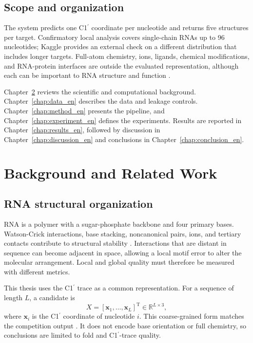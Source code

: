 \documentclass[12pt,a4paper,oneside]{report}
\newcommand{\cprime}{C1$^{\prime}$}
\newcommand{\T}{\mathrm{T}}
\begin{document}
\section{Scope and organization}

The system predicts one \cprime{} coordinate per nucleotide and returns five structures
per target. Confirmatory local analysis covers single-chain RNAs up to 96 nucleotides;
Kaggle provides an external check on a different distribution that includes longer
targets. Full-atom chemistry, ions, ligands, chemical modifications, and RNA-protein
interfaces are outside the evaluated representation, although each can be important to
RNA structure and function \cite{butcher_tertiary,zhang_experimental_review}.

Chapter~\ref{chap:background_en} reviews the scientific and computational background.
Chapter~\ref{chap:data_en} describes the data and leakage controls.
Chapter~\ref{chap:method_en} presents the pipeline, and
Chapter~\ref{chap:experiment_en} defines the experiments. Results are reported in
Chapter~\ref{chap:results_en}, followed by discussion in
Chapter~\ref{chap:discussion_en} and conclusions in Chapter~\ref{chap:conclusion_en}.

\chapter{Background and Related Work}
\label{chap:background_en}

\section{RNA structural organization}

RNA is a polymer with a sugar-phosphate backbone and four primary bases. Watson-Crick
interactions, base stacking, noncanonical pairs, ions, and tertiary contacts contribute
to structural stability \cite{tinoco_folding,butcher_tertiary}. Interactions that are
distant in sequence can become adjacent in space, allowing a local motif error to alter
the molecular arrangement. Local and global quality must therefore be measured with
different metrics.

This thesis uses the \cprime{} trace as a common representation. For a sequence of
length $L$, a candidate is
\begin{equation}
X=[\mathbf{x}_1,\ldots,\mathbf{x}_L]^\T\in\mathbb{R}^{L\times3},
\end{equation}
where $\mathbf{x}_i$ is the \cprime{} coordinate of nucleotide $i$. This coarse-grained
form matches the competition output \cite{competition_paper,kaggle_competition}. It
does not encode base orientation or full chemistry, so conclusions are limited to fold
and \cprime{}-trace quality.
\end{document}
